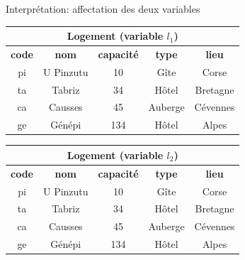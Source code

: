 \begin{frame}[fragile]{Interprétation: affectation des deux variables}

\begin{tabular}{c|c|c|c|c}
\multicolumn{5}{c}{\textbf{Logement (variable $l_1$)}}\\ \hline
\textbf{code} & \textbf{nom} & \textbf{capacité} & \textbf{type} & \textbf{lieu}\\ \hline 
pi & U Pinzutu & 10 & Gîte & Corse\\ \hline 
\rowcolor{asparagus}
ta & Tabriz & 34 & Hôtel & Bretagne\\ \hline 
ca & Causses & 45 & Auberge & Cévennes\\ \hline 
ge & Génépi & 134 & Hôtel & Alpes\\ \hline 
\end{tabular}

\vfill

\begin{tabular}{c|c|c|c|c}
\multicolumn{5}{c}{\textbf{Logement (variable $l_2$)}}\\ \hline
\textbf{code} & \textbf{nom} & \textbf{capacité} & \textbf{type} & \textbf{lieu}\\ \hline 
pi & U Pinzutu & 10 & Gîte & Corse\\ \hline 
ta & Tabriz & 34 & Hôtel & Bretagne\\ \hline 
ca & Causses & 45 & Auberge & Cévennes\\ \hline 
\rowcolor{bananamania}
ge & Génépi & 134 & Hôtel & Alpes\\ \hline 
\end{tabular}

\end{frame}


